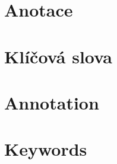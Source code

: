 \documentclass{Template/Thesis}
\author{tvoje jméno}
\begin{document}



\renewcommand{\thelstlisting}{\arabic{lstlisting}}

\maketitle







\makethanks{
}

\pagestyle{empty}



\section*{Anotace}



\section*{Klíčová slova}



\vspace{20mm}

\section*{Annotation}



\section*{Keywords}

\end{document}
